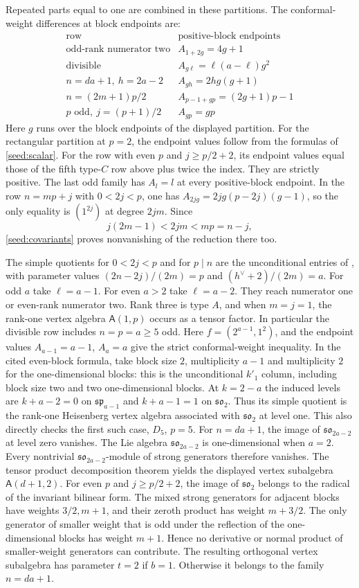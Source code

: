 \documentclass[11pt,a4paper]{amsart}
\numberwithin{equation}{section}
\theoremstyle{definition}
\theoremstyle{remark}
\newcommand{\spg}{\mathfrak{sp}}
\newcommand{\sog}{\mathfrak{so}}
\begin{document}
Repeated parts equal to one are combined in these partitions.
The conformal-weight differences at block endpoints are:
$$
\begin{array}{c|c}
\text{row}&\text{positive-block endpoints}\\\hline
\text{odd-rank numerator two}&A_{1+2g}=4g+1\\
\text{divisible}&A_{g\ell}=\ell(a-\ell)g^2\\
n=da+1,\ h=2a-2&A_{gh}=2hg(g+1)\\
n=(2m+1)p/2&A_{p-1+gp}=(2g+1)p-1\\
p\text{ odd},\ j=(p+1)/2&A_{gp}=gp
\end{array}
$$
Here $g$ runs over the block endpoints of the displayed partition.
For the rectangular partition at $p=2$, the endpoint values follow
from the formulas of \cref{seed:scalar}.
For the row with even $p$ and $j\ge p/2+2$, its endpoint values equal
those of the fifth type-$C$ row above plus twice the index. They are strictly positive.
The last odd family has $A_l=l$ at every positive-block endpoint.
In the row $n=mp+j$ with $0<2j<p$, one has
$A_{2jg}=2jg(p-2j)(g-1)$, so the only equality is $(1^{2j})$ at degree $2jm$. Since
$$
 j(2m-1)<2jm<mp=n-j,
$$
\cref{seed:covariants} proves nonvanishing of the reduction there too.

The simple quotients for $0<2j<p$ and for $p\mid n$ are the unconditional entries of
\cite[arXiv v3, Propositions~4.10--4.11, Table~1]{AdamovicEtAl2026}, with parameter values
$(2n-2j)/(2m)=p$ and $(h^\vee+2)/(2m)=a$.
For odd $a$ take $\ell=a-1$. For even $a>2$ take $\ell=a-2$.
They reach numerator one or even-rank numerator two. Rank three is
type $A$, and when $m=j=1$, the rank-one vertex algebra $\mathsf A(1,p)$ occurs as a tensor factor.
In particular the divisible row includes $n=p=a\ge5$ odd.
Here $f=(2^{a-1},1^2)$, and the endpoint values
$A_{a-1}=a-1$, $A_a=a$ give the strict conformal-weight inequality.
In the cited even-block formula, take block size $2$, multiplicity
$a-1$ and multiplicity $2$ for the one-dimensional blocks: this is the unconditional $k'_1$
column, including block size two and two one-dimensional blocks. At $k=2-a$
the induced levels are $k+a-2=0$ on $\spg_{a-1}$
and $k+a-1=1$ on $\sog_2$. Thus its simple quotient is the
rank-one Heisenberg vertex algebra associated with $\sog_2$
at level one. This also directly checks the first
such case, $D_5$, $p=5$.
For $n=da+1$, the image of $\sog_{2a-2}$ at level zero
vanishes. The Lie algebra $\sog_{2a-2}$ is one-dimensional when $a=2$. Every nontrivial
$\sog_{2a-2}$-module of strong generators therefore vanishes.
The tensor product decomposition theorem yields the displayed
vertex subalgebra $\mathsf A(d+1,2)$. For even $p$ and $j\ge p/2+2$, the image of $\sog_2$
belongs to the radical of the invariant bilinear form. The mixed
strong generators for adjacent blocks have weights $3/2,m+1$,
and their zeroth product has weight $m+3/2$. The only generator of
smaller weight that is odd under the reflection of the
one-dimensional blocks has weight $m+1$. Hence no derivative or
normal product of smaller-weight generators can contribute.
The resulting orthogonal vertex subalgebra has parameter $t=2$
if $b=1$. Otherwise it belongs to the family $n=da+1$.
\end{document}
